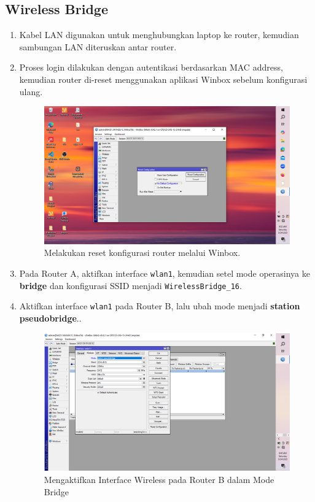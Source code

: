 \subsection{Wireless Bridge}
\begin{enumerate}
    \item Kabel LAN digunakan untuk menghubungkan laptop ke router, kemudian sambungan LAN diteruskan antar router.
    \item Proses login dilakukan dengan autentikasi berdasarkan MAC address, kemudian router di-reset menggunakan aplikasi Winbox sebelum konfigurasi ulang.
    \begin{figure}[H]
        \centering
        \includegraphics[width=0.5\linewidth]{P3/img/gambar1.png}
        \caption{Melakukan reset konfigurasi router melalui Winbox.}
        \label{fig:reset-bridge}
    \end{figure}

    \item Pada Router A, aktifkan interface \texttt{wlan1}, kemudian setel mode operasinya ke \textbf{bridge} dan konfigurasi SSID menjadi \texttt{WirelessBridge\_16}.

    \item Aktifkan interface \texttt{wlan1} pada Router B, lalu ubah mode menjadi \textbf{station pseudobridge}..
    \begin{figure}[H]
        \centering
        \includegraphics[width=0.5\linewidth]{P3/img/gambar3w.png}
        \caption{Mengaktifkan Interface Wireless pada Router B dalam Mode Bridge}
        \label{fig:wlan-b-bridge}
    \end{figure}


\end{enumerate}
